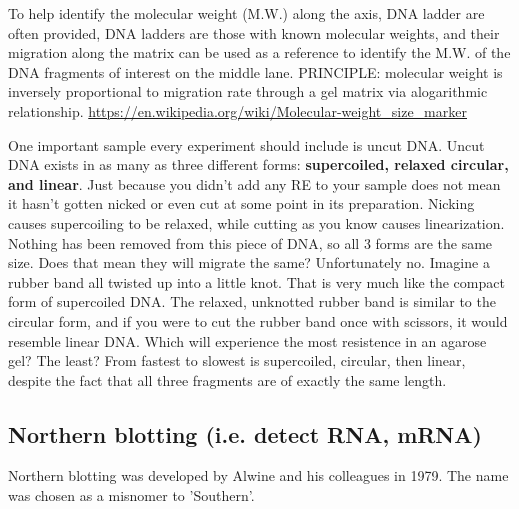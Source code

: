   
  To help identify the molecular weight (M.W.) along the axis, DNA ladder
  are often provided, DNA ladders are those with known molecular weights, and their
  migration along the matrix can be used as a reference to identify the M.W. of
  the DNA fragments of interest on the middle lane.
  PRINCIPLE: molecular weight is inversely proportional to migration rate through a gel
  matrix via alogarithmic relationship.
  \url{https://en.wikipedia.org/wiki/Molecular-weight_size_marker}
  
  One important sample every experiment should include is uncut DNA. Uncut DNA
  exists in as many as three different forms: {\bf supercoiled, relaxed
  circular, and linear}. Just because you didn't add any RE to your sample does
  not mean it hasn't gotten nicked or even cut at some point in its preparation. Nicking
  causes supercoiling to be relaxed, while cutting as you know causes
  linearization. Nothing has been removed from this piece of DNA, so all 3 forms
  are the same size. Does that mean they will migrate the same? Unfortunately
  no. Imagine a rubber band all twisted up into a little knot. That is very much
  like the compact form of supercoiled DNA. The relaxed, unknotted rubber band
  is similar to the circular form, and if you were to cut the rubber band once
  with scissors, it would resemble linear DNA. Which will experience the most
  resistence in an agarose gel? The least? From fastest to slowest is
  supercoiled, circular, then linear, despite the fact that all three fragments
  are of exactly the same length.
  
  

\subsection{Northern blotting (i.e. detect RNA, mRNA)}
\label{sec:Northern-blotting}

Northern blotting was developed by Alwine and his colleagues in 1979.
The name was chosen as a misnomer to 'Southern'.

